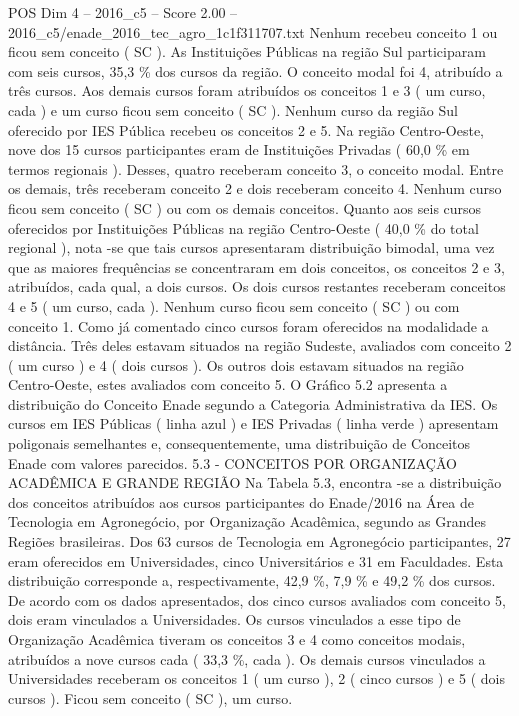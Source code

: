\begin{textsample}{POS Dim 4 – 2016\_c5 – Score 2.00 – 2016\_c5/enade\_2016\_tec\_agro\_1c1f311707.txt}
Nenhum recebeu conceito 1 ou ficou sem conceito ( SC ).
As Instituições Públicas na região Sul participaram com seis cursos, 35,3 \% dos cursos da região.
O conceito modal foi 4, atribuído a três cursos.
Aos demais cursos foram atribuídos os conceitos 1 e 3 ( um curso, cada ) e um curso ficou sem conceito ( SC ).
Nenhum curso da região Sul oferecido por IES Pública recebeu os conceitos 2 e 5.
Na região Centro-Oeste, nove dos 15 cursos participantes eram de Instituições Privadas ( 60,0 \% em termos regionais ).
Desses, quatro receberam conceito 3, o conceito modal.
Entre os demais, três receberam conceito 2 e dois receberam conceito 4.
Nenhum curso ficou sem conceito ( SC ) ou com os demais conceitos.
Quanto aos seis cursos oferecidos por Instituições Públicas na região Centro-Oeste ( 40,0 \% do total regional ), nota -se que tais cursos apresentaram distribuição bimodal, uma vez que as maiores frequências se concentraram em dois conceitos, os conceitos 2 e 3, atribuídos, cada qual, a dois cursos.
Os dois cursos restantes receberam conceitos 4 e 5 ( um curso, cada ).
Nenhum curso ficou sem conceito ( SC ) ou com conceito 1.
Como já comentado cinco cursos foram oferecidos na modalidade a distância.
Três deles estavam situados na região Sudeste, avaliados com conceito 2 ( um curso ) e 4 ( dois cursos ).
Os outros dois estavam situados na região Centro-Oeste, estes avaliados com conceito 5.
O Gráfico 5.2 apresenta a distribuição do Conceito Enade segundo a Categoria Administrativa da IES.
Os cursos em IES Públicas ( linha azul ) e IES Privadas ( linha verde ) apresentam poligonais semelhantes e, consequentemente, uma distribuição de Conceitos Enade com valores parecidos. 5.3 - CONCEITOS POR ORGANIZAÇÃO ACADÊMICA E GRANDE REGIÃO Na Tabela 5.3, encontra -se a distribuição dos conceitos atribuídos aos cursos participantes do Enade/2016 na Área de Tecnologia em Agronegócio, por Organização Acadêmica, segundo as Grandes Regiões brasileiras.
Dos 63 cursos de Tecnologia em Agronegócio participantes, 27 eram oferecidos em Universidades, cinco Universitários e 31 em Faculdades.
Esta distribuição corresponde a, respectivamente, 42,9 \%, 7,9 \% e 49,2 \% dos cursos.
De acordo com os dados apresentados, dos cinco cursos avaliados com conceito 5, dois eram vinculados a Universidades.
Os cursos vinculados a esse tipo de Organização Acadêmica tiveram os conceitos 3 e 4 como conceitos modais, atribuídos a nove cursos cada ( 33,3 \%, cada ).
Os demais cursos vinculados a Universidades receberam os conceitos 1 ( um curso ), 2 ( cinco cursos ) e 5 ( dois cursos ).
Ficou sem conceito ( SC ), um curso.

\end{textsample}
